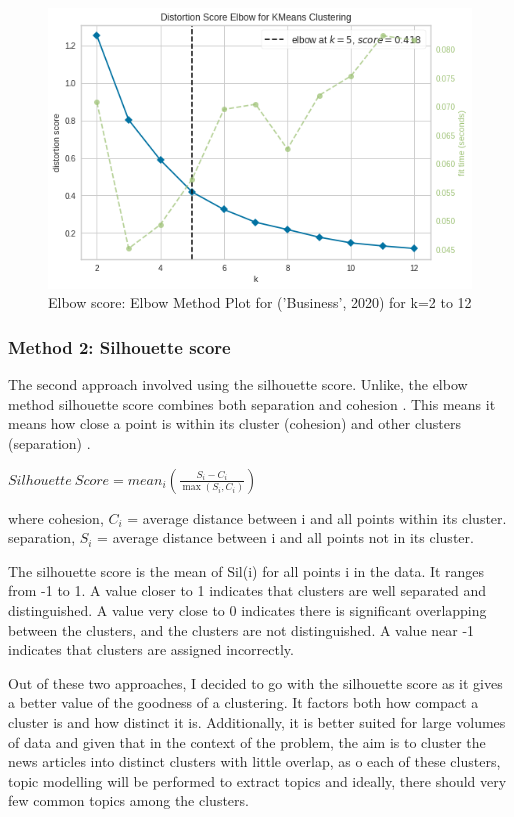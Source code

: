 \begin{figure}[H]
\centering
\includegraphics[scale=0.5]{images/elbow.png}
\caption{Elbow score: Elbow Method Plot for ('Business', 2020) for k=2 to 12}
\label{fig:elbow}
\end{figure}

\subsubsection{Method 2: Silhouette score}

The second approach involved using the silhouette score. Unlike, the elbow method silhouette score combines both separation and cohesion \cite{elbowvssil}. This means it means how close a point is within its cluster (cohesion) and other clusters (separation) \cite{silhouette}.

\begin{center}
    $\mathit{Silhouette \ Score }= \mathit{mean}_i (\frac{S_i - C_i}{\max(S_i, C_i)}) $
\end{center}
where 
cohesion, $C_i$ = average distance between i and all points within its cluster.
separation, $S_i$ = average distance between i and all points not in its cluster.

The silhouette score is the mean of Sil(i) for all points i in the data. It ranges from -1 to 1. A value closer to 1 indicates that clusters are well separated and distinguished. A value very close to 0 indicates there is significant overlapping between the clusters, and the clusters are not distinguished. A value near -1 indicates that clusters are assigned incorrectly.

Out of these two approaches, I decided to go with the silhouette score as it gives a better value of the goodness of a clustering. It factors both how compact a cluster is and how distinct it is. Additionally, it is better suited for large volumes of data and given that in the context of the problem, the aim is to cluster the news articles into distinct clusters with little overlap, as o each of these clusters, topic modelling will be performed to extract topics and ideally, there should very few common topics among the clusters.

